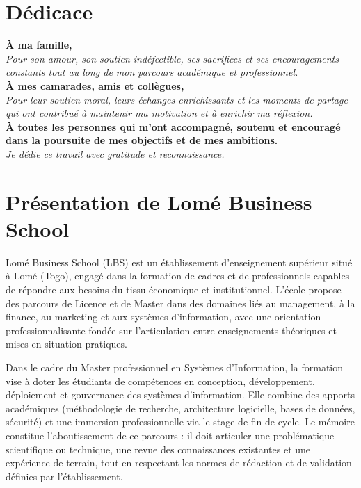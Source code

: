 \documentclass[12pt,a4paper]{report}
\begin{document}
\clearpage
\chapter*{Dédicace}
\begin{center}
\vspace*{1cm}
\textbf{À ma famille,}\\[0.8em]
\textit{Pour son amour, son soutien indéfectible, ses sacrifices et ses encouragements constants tout au long de mon parcours académique et professionnel.}\\[1.2em]
\textbf{À mes camarades, amis et collègues,}\\[0.8em]
\textit{Pour leur soutien moral, leurs échanges enrichissants et les moments de partage qui ont contribué à maintenir ma motivation et à enrichir ma réflexion.}\\[1.2em]
\textbf{À toutes les personnes qui m’ont accompagné, soutenu et encouragé dans la poursuite de mes objectifs et de mes ambitions.}\\[1.2em]
\textit{Je dédie ce travail avec gratitude et reconnaissance.}
\end{center}

\clearpage
\chapter*{Présentation de Lomé Business School}
Lomé Business School (LBS) est un établissement d'enseignement supérieur situé à Lomé (Togo), engagé dans la formation de cadres et de professionnels capables de répondre aux besoins du tissu économique et institutionnel. L'école propose des parcours de Licence et de Master dans des domaines liés au management, à la finance, au marketing et aux systèmes d'information, avec une orientation professionnalisante fondée sur l'articulation entre enseignements théoriques et mises en situation pratiques.

Dans le cadre du Master professionnel en Systèmes d'Information, la formation vise à doter les étudiants de compétences en conception, développement, déploiement et gouvernance des systèmes d'information. Elle combine des apports académiques (méthodologie de recherche, architecture logicielle, bases de données, sécurité) et une immersion professionnelle via le stage de fin de cycle. Le mémoire constitue l'aboutissement de ce parcours : il doit articuler une problématique scientifique ou technique, une revue des connaissances existantes et une expérience de terrain, tout en respectant les normes de rédaction et de validation définies par l'établissement.
\end{document}
